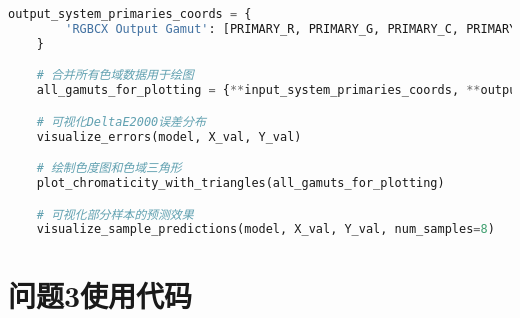 \begin{lstlisting}[language=Python]
    output_system_primaries_coords = {
        'RGBCX Output Gamut': [PRIMARY_R, PRIMARY_G, PRIMARY_C, PRIMARY_B, PRIMARY_X]
    }

    # 合并所有色域数据用于绘图
    all_gamuts_for_plotting = {**input_system_primaries_coords, **output_system_primaries_coords}

    # 可视化DeltaE2000误差分布
    visualize_errors(model, X_val, Y_val)

    # 绘制色度图和色域三角形
    plot_chromaticity_with_triangles(all_gamuts_for_plotting)

    # 可视化部分样本的预测效果
    visualize_sample_predictions(model, X_val, Y_val, num_samples=8)
\end{lstlisting}

\section[\hspace{-2pt}问题3使用代码]{{\heiti{} \hspace{-8pt}问题3使用代码}}
